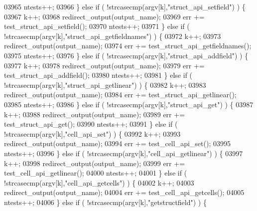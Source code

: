 \begin{DoxyCode}
{{{{{{{{{{{{{{{{{{{{{{{{{{{{{{{{{{{{{{{{{{{{{{{{{{{{{{{{{{{{{{{{{{{{03965             ntests++;
03966         \} \textcolor{keywordflow}{else} \textcolor{keywordflow}{if} ( !strcasecmp(argv[k],\textcolor{stringliteral}{"struct\_api\_setfield"}) ) \{
03967             k++;
03968             redirect\_output(output\_name);
03969             err += test\_struct\_api\_setfield();
03970             ntests++;
03971         \} \textcolor{keywordflow}{else} \textcolor{keywordflow}{if} ( !strcasecmp(argv[k],\textcolor{stringliteral}{"struct\_api\_getfieldnames"}) ) \{
03972             k++;
03973             redirect\_output(output\_name);
03974             err += test\_struct\_api\_getfieldnames();
03975             ntests++;
03976         \} \textcolor{keywordflow}{else} \textcolor{keywordflow}{if} ( !strcasecmp(argv[k],\textcolor{stringliteral}{"struct\_api\_addfield"}) ) \{
03977             k++;
03978             redirect\_output(output\_name);
03979             err += test\_struct\_api\_addfield();
03980             ntests++;
03981         \} \textcolor{keywordflow}{else} \textcolor{keywordflow}{if} ( !strcasecmp(argv[k],\textcolor{stringliteral}{"struct\_api\_getlinear"}) ) \{
03982             k++;
03983             redirect\_output(output\_name);
03984             err += test\_struct\_api\_getlinear();
03985             ntests++;
03986         \} \textcolor{keywordflow}{else} \textcolor{keywordflow}{if} ( !strcasecmp(argv[k],\textcolor{stringliteral}{"struct\_api\_get"}) ) \{
03987             k++;
03988             redirect\_output(output\_name);
03989             err += test\_struct\_api\_get();
03990             ntests++;
03991         \} \textcolor{keywordflow}{else} \textcolor{keywordflow}{if} ( !strcasecmp(argv[k],\textcolor{stringliteral}{"cell\_api\_set"}) ) \{
03992             k++;
03993             redirect\_output(output\_name);
03994             err += test\_cell\_api\_set();
03995             ntests++;
03996         \} \textcolor{keywordflow}{else} \textcolor{keywordflow}{if} ( !strcasecmp(argv[k],\textcolor{stringliteral}{"cell\_api\_getlinear"}) ) \{
03997             k++;
03998             redirect\_output(output\_name);
03999             err += test\_cell\_api\_getlinear();
04000             ntests++;
04001         \} \textcolor{keywordflow}{else} \textcolor{keywordflow}{if} ( !strcasecmp(argv[k],\textcolor{stringliteral}{"cell\_api\_getcells"}) ) \{
04002             k++;
04003             redirect\_output(output\_name);
04004             err += test\_cell\_api\_getcells();
04005             ntests++;
04006         \} \textcolor{keywordflow}{else} \textcolor{keywordflow}{if} ( !strcasecmp(argv[k],\textcolor{stringliteral}{"getstructfield"}) ) \{
}}}}}}}}}}}}}}}}}}}}}}}}}}}}}}}}}}}}}}}}}}}}}}}}}}}}}}}}}}}}}}}}}}}}
\end{DoxyCode}
